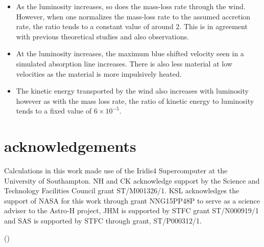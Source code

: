 \documentclass[a4paper,fleqn,usenatbib]{mnras}
\begin{document}
\begin{itemize}
\item{As the luminosity increases, so does the mass-loss rate through the wind. However, 
when one normalizes the mass-loss rate to the assumed accretion rate, the ratio tends to 
a constant value of around 2. This is in agreement with previous theoretical studies and 
also observations.}
\item{At the luminosity increases, the maximum blue shifted velocity seen in a simulated 
absorption line increases. There is also less material at low velocities as the material 
is more impulsively heated.}
\item{The kinetic energy transported by the wind also increases with luminosity however 
as with the mass loss rate, the ratio of kinetic energy to luminosity tends to a fixed value
of $6\times10^{-5}$.}


\end{itemize}

\section{acknowledgements}
Calculations in this work made use of the Iridis4 Supercomputer at the University of Southampton.
NH and CK  acknowledge support by the Science and Technology Facilities Council grant ST/M001326/1. 
KSL acknowledges the support of NASA for this work through grant NNG15PP48P to serve as a 
science adviser to the Astro-H project, JHM is supported by STFC grant ST/N000919/1 and SAS 
is supported by STFC through grant, ST/P000312/1. 




()
\label{lastpage}

\bsp	%
\end{document}
